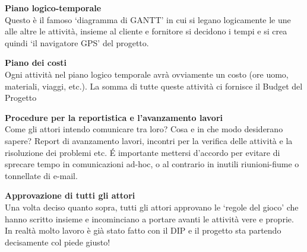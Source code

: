 \textbf{Piano logico-temporale}\\
Questo è il famoso ‘diagramma di GANTT’ in cui si legano logicamente le une alle altre le attività, insieme al cliente e fornitore si decidono i tempi e si crea quindi ‘il navigatore GPS’ del progetto.

\textbf{Piano dei costi}\\
Ogni attività nel piano logico temporale avrà ovviamente un costo (ore uomo, materiali, viaggi, etc.). La somma di tutte queste attività ci fornisce il Budget del Progetto

\textbf{Procedure per la reportistica e l’avanzamento lavori}\\
Come gli attori intendo comunicare tra loro? Cosa e in che modo desiderano sapere? Report di avanzamento lavori, incontri per la verifica delle attività e la risoluzione dei problemi etc. É importante mettersi d’accordo per evitare di sprecare tempo in comunicazioni ad-hoc, o al contrario in inutili riunioni-fiume o tonnellate di e-mail.

\textbf{Approvazione di tutti gli attori}\\
Una volta deciso quanto sopra, tutti gli attori approvano le ‘regole del gioco’ che hanno scritto insieme e incominciano a portare avanti le attività vere e proprie. In realtà molto lavoro è già stato fatto con il DIP e il progetto sta partendo decisamente col piede giusto!




